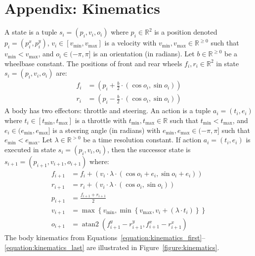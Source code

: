 \documentclass[10pt]{article}
\theoremstyle{plain}
\DeclareMathOperator*{\atantwo}{atan2}
\begin{document}
\section*{Appendix: Kinematics}
A state is a tuple $s_{i} = (p_{i}, v_{i}, o_{i})$ where
$p_{i} \in \mathbb{R}^{2}$ is a position denoted $p_{i} = (p_{i}^{x}, p_{i}^{y})$,
$v_{i} \in [v_{\min}, v_{\max}]$ is a velocity with $v_{\min}, v_{\max} \in \mathbb{R}^{\ge 0}$ such that $v_{\min} < v_{\max}$,
and $o_{i} \in (-\pi, \pi]$ is an orientation (in radians).
Let $b \in \mathbb{R}^{\ge 0}$ be a wheelbase constant.
The positions of front and rear wheels $f_{i}, r_{i} \in \mathbb{R}^{2}$ in state $s_{i} = (p_{i}, v_{i}, o_{i})$ are:
\begin{align}
    f_{i} & = \left( p_{i} + \frac{b}{2} \cdot (\cos{o_{i}}, \sin{o_{i}}) \right) \label{equation:kinematics_first} \\
    r_{i} & = \left( p_{i} - \frac{b}{2} \cdot \left( \cos{o_{i}}, \sin{o_{i}} \right) \right)
\end{align}
A body has two effectors: throttle and steering.
An action is a tuple $a_{i} = (t_{i}, e_{i})$ where
$t_{i} \in [t_{\min}, t_{\max}]$ is a throttle with $t_{\min}, t_{\max} \in \mathbb{R}$ such that $t_{\min} < t_{\max}$,
and $e_{i} \in (e_{\min}, e_{\max}]$ is a steering angle (in radians) with $e_{\min}, e_{\max} \in (-\pi, \pi]$ such that $e_{\min} < e_{\max}$.
Let $\lambda \in \mathbb{R}^{> 0}$ be a time resolution constant.
If action $a_{i} = (t_{i}, e_{i})$ is executed in state $s_{i} = (p_{i}, v_{i}, o_{i})$, then the successor state is $s_{i+1} = (p_{i+1}, v_{i+1}, o_{i+1})$ where:
\begin{align}
    f_{i+1} & = f_{i} + \left( v_{i} \cdot \lambda \cdot \left( \cos{o_{i} + e_{i}}, \sin{o_{i} + e_{i}} \right) \right) \\
    r_{i+1} & = r_{i} + \left( v_{i} \cdot \lambda \cdot \left( \cos{o_{i}}, \sin{o_{i}} \right) \right) \\
    p_{i+1} & = \frac{f_{i+1} + r_{i+1}}{2}  \\
    v_{i+1} & = \max{ \left\{ v_{\min}, \min{ \left\{ v_{\max}, v_{i} + \left( \lambda \cdot t_{i} \right) \right\} } \right\} } \\
    o_{i+1} & = \atantwo{ \left( f_{i+1}^{y} - r_{i+1}^{y}, f_{i+1}^{x} - r_{i+1}^{x} \right) } \label{equation:kinematics_last}
\end{align}
The body kinematics from Equations~\ref{equation:kinematics_first}--\ref{equation:kinematics_last} are illustrated in Figure~\ref{figure:kinematics}.
\end{document}
